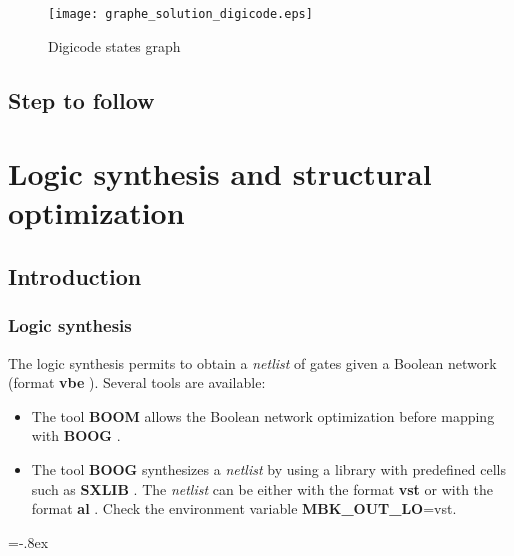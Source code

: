 \documentclass{article}
\newenvironment{commandline}
  {\VerbatimEnvironment\par\vspace*{2mm}\noindent\footnotesize
   \begin{Sbox}\begin{minipage}{.979\textwidth}\begin{Verbatim}}%
  {\end{Verbatim}\end{minipage}\end{Sbox}\setlength{\shadowsize}{2pt}%
  \shadowbox{\TheSbox}\normalsize\par\noindent}
\begin{document}
{\begin{figure}[H]\centering
 \texttt{[image: graphe\_solution\_digicode.eps]}
 \caption{Digicode states graph}
 \label{Fig:graph 2}
\end{figure}

\subsection{Step to follow}


\newpage

\section{Logic synthesis and structural optimization}

\subsection{Introduction}

\subsubsection{Logic synthesis}
    The logic synthesis permits to obtain a { \it netlist } of
    gates given a Boolean network (format { \bf vbe }). 
    Several tools are available:

\begin{itemize}\itemsep=-.8ex
\item  The tool { \bf BOOM } allows the Boolean network optimization before mapping with { \bf BOOG }.
\item  The tool { \bf BOOG } synthesizes a { \it netlist } by using a library
       with predefined cells such as { \bf SXLIB }.
       The { \it netlist } can be either with the format { \bf vst } or with the format { \bf al }.
       Check the environment variable { \bf MBK\_OUT\_LO}=vst.
\end{itemize}\itemsep=-.8ex

}
\end{document}
